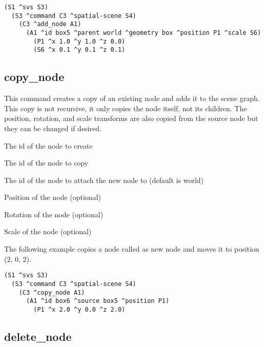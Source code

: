\begin{verbatim}
(S1 ^svs S3)
  (S3 ^command C3 ^spatial-scene S4)
    (C3 ^add_node A1)
      (A1 ^id box5 ^parent world ^geometry box ^position P1 ^scale S6)
        (P1 ^x 1.0 ^y 1.0 ^z 0.0)
        (S6 ^x 0.1 ^y 0.1 ^z 0.1)
\end{verbatim}


\subsection{copy\_node}

This command creates a copy of an existing node and adds it to the scene graph. 
This copy is not recursive, it only copies the node itself, not its children. 
The position, rotation, and scale transforms are also copied from the source node
but they can be changed if desired. 

\begin{description}
	\item{} The id of the node to create
	\item{} The id of the node to copy
	\item{} The id of the node to attach the new node to (default is world)
	\item{} Position of the node (optional)
	\item{} Rotation of the node (optional)
	\item{} Scale of the node (optional)
\end{description}

The following example copies a node called  as new node 
and moves it to position (2, 0, 2).

\begin{verbatim}
(S1 ^svs S3)
  (S3 ^command C3 ^spatial-scene S4)
    (C3 ^copy_node A1)
      (A1 ^id box6 ^source box5 ^position P1)
        (P1 ^x 2.0 ^y 0.0 ^z 2.0)
\end{verbatim}


\subsection{delete\_node}

